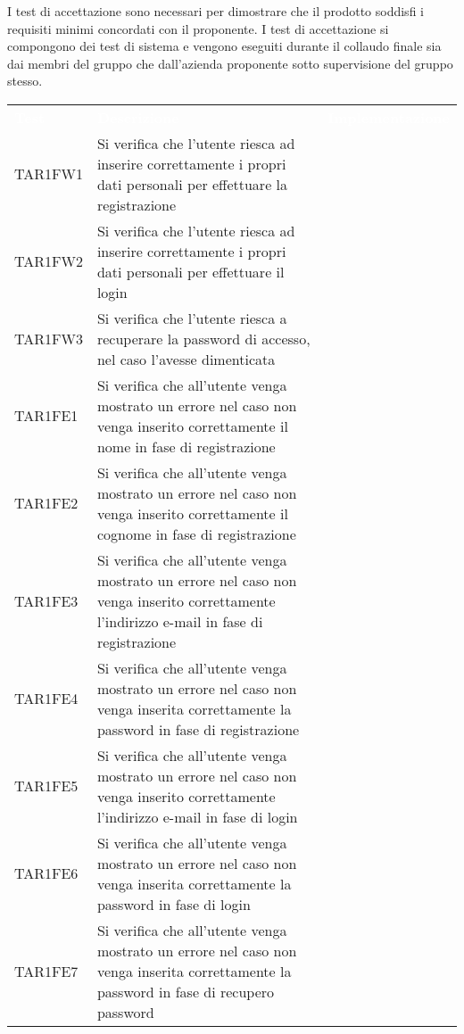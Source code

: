 I test di accettazione sono necessari per dimostrare che il prodotto soddisfi i requisiti minimi concordati con il proponente.
I test di accettazione si compongono dei test di sistema e vengono eseguiti durante il collaudo finale sia dai membri del gruppo che dall’azienda proponente sotto supervisione del gruppo
stesso.
\renewcommand{\arraystretch}{1.5}
\begin{longtable}{ m{}<{\centering}  m{}<{\centering}  m{}<{\centering} }
	\rowcolor{darkblue}
	\textcolor{white}{\textbf{Test}} &\textcolor{white}{\textbf{Descrizione}} & \textcolor{white}{\textbf{Implementazione}} \\ 

	TAR1FW1 & Si verifica che l'utente riesca ad inserire correttamente i propri dati personali per effettuare la registrazione & \Ni \\
	TAR1FW2 & Si verifica che l'utente riesca ad inserire correttamente i propri dati personali per effettuare il login & \Ni \\
	TAR1FW3 & Si verifica che l'utente riesca a recuperare la password di accesso, nel caso l'avesse dimenticata & \Ni \\
	TAR1FE1 & Si verifica che all'utente venga mostrato un errore nel caso non venga inserito correttamente il nome in fase di registrazione & \Ni \\
	TAR1FE2 & Si verifica che all'utente venga mostrato un errore nel caso non venga inserito correttamente il cognome in fase di registrazione & \Ni \\
	TAR1FE3 & Si verifica che all'utente venga mostrato un errore nel caso non venga inserito correttamente l'indirizzo e-mail in fase di registrazione & \Ni \\
	TAR1FE4 & Si verifica che all'utente venga mostrato un errore nel caso non venga inserita correttamente la password in fase di registrazione & \Ni \\
	TAR1FE5 & Si verifica che all'utente venga mostrato un errore nel caso non venga inserito correttamente l'indirizzo e-mail in fase di login & \Ni \\
	TAR1FE6 & Si verifica che all'utente venga mostrato un errore nel caso non venga inserita correttamente la password in fase di login & \Ni \\
	TAR1FE7 & Si verifica che all'utente venga mostrato un errore nel caso non venga inserita correttamente la password in fase di recupero password & \Ni \\

\end{longtable}
